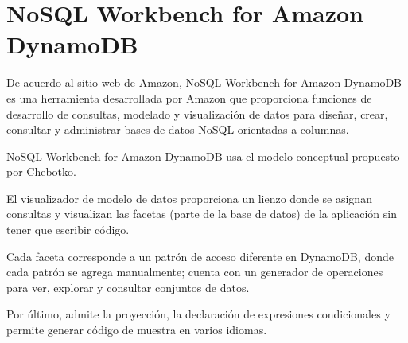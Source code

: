 \section{NoSQL Workbench for Amazon DynamoDB}

De acuerdo al sitio web de Amazon\cite{amazon_nosql_2020}, NoSQL Workbench for Amazon DynamoDB es una herramienta desarrollada por Amazon que proporciona funciones de desarrollo de consultas, modelado y visualización de datos para diseñar, crear, consultar y administrar bases de datos NoSQL orientadas a columnas.


NoSQL Workbench for Amazon DynamoDB usa el modelo conceptual propuesto por Chebotko\cite{chebotko_big_2015}.


El visualizador de modelo de datos proporciona un lienzo donde se asignan consultas y visualizan las facetas (parte de la base de datos) de la aplicación sin tener que escribir código.


Cada faceta corresponde a un patrón de acceso diferente en DynamoDB, donde cada patrón se agrega manualmente; cuenta con un generador de operaciones para ver, explorar y consultar conjuntos de datos.


Por último, admite la proyección, la declaración de expresiones condicionales y permite generar código de muestra en varios idiomas.

